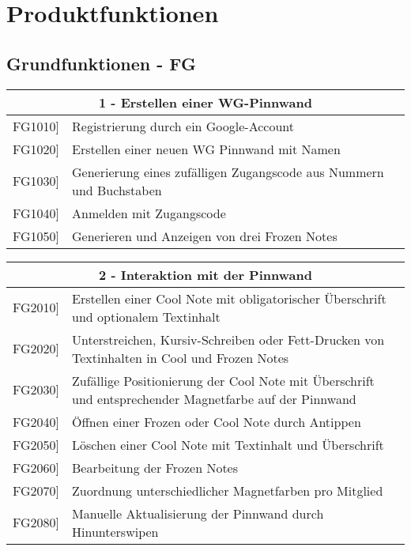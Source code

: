 \documentclass[a4paper]{scrreprt}
\begin{document}
    \chapter{Produktfunktionen}
    		\section{Grundfunktionen - FG}
    		
    		\begin{table}[h!]
    			\centering
    			\label{my-label}
    			\begin{tabular}{p{2cm}p{12cm}}
    				
    				\multicolumn{2}{c}{\textbf{1 - Erstellen einer WG-Pinnwand}} \\ \hline
    				\centering{[}FG1010{]} & Registrierung durch ein Google-Account\\
    				\centering{[}FG1020{]}& Erstellen einer neuen WG Pinnwand mit Namen                                 \\
    				\centering{[}FG1030{]}& Generierung eines zufälligen Zugangscode aus Nummern und Buchstaben\\ 
    				\centering{[}FG1040{]}& Anmelden mit Zugangscode\\ 
    				\centering{[}FG1050{]}& Generieren und Anzeigen von drei Frozen Notes\\ 
    				\hline
    			\end{tabular}
    		\end{table}
    		
    		\vspace{5mm}
    		
    		\begin{table}[h!]
    			\centering
    			\label{my-label}
    			\begin{tabular}{p{2cm}p{12cm}}
    				
    				\multicolumn{2}{c}{\textbf{2 - Interaktion mit der Pinnwand}} \\ \hline
    				\centering{[}FG2010{]} & Erstellen einer Cool Note mit obligatorischer Überschrift und optionalem Textinhalt\\
    				\centering{[}FG2020{]}& Unterstreichen, Kursiv-Schreiben oder Fett-Drucken von Textinhalten in Cool und Frozen Notes                               \\
    				\centering{[}FG2030{]}& Zufällige Positionierung der Cool Note mit Überschrift und entsprechender Magnetfarbe auf der Pinnwand\\ 
    				\centering{[}FG2040{]}& Öffnen einer Frozen oder Cool Note durch Antippen\\ 
    				\centering{[}FG2050{]}& Löschen einer Cool Note mit Textinhalt und Überschrift\\ 
    				\centering{[}FG2060{]}& Bearbeitung der Frozen Notes\\ 
    				\centering{[}FG2070{]}& Zuordnung unterschiedlicher Magnetfarben pro Mitglied\\ 
    				\centering{[}FG2080{]}& Manuelle Aktualisierung der Pinnwand durch Hinunterswipen\\ 
    				\hline
    			\end{tabular}
    		\end{table}
    		
\end{document}
